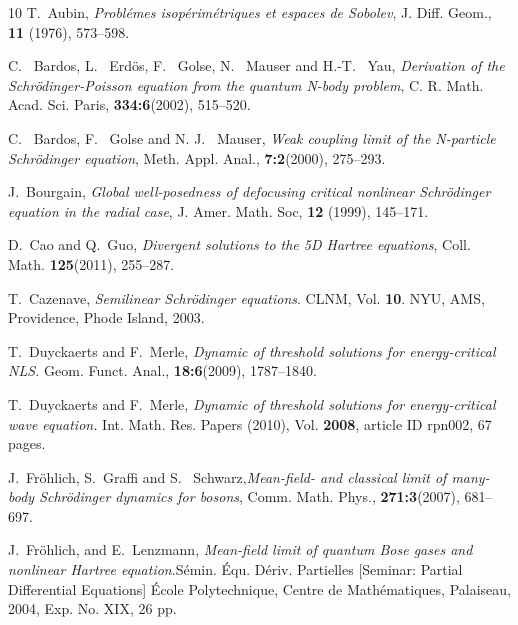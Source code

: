 \documentclass[reqno, 11pt]{amsart}
\numberwithin{equation}{section}
\theoremstyle{plain}
\theoremstyle{definition}
\numberwithin{equation}{section}
\numberwithin{theorem}{section}
\numberwithin{equation}{section}
\numberwithin{equation}{section}
\numberwithin{theorem}{section}
\begin{document}
	
	\def\cprime{$'$}
	\begin{thebibliography}{10}
		T.~Aubin, \emph{Probl\'emes isop\'erim\'etriques et espaces de Sobolev},
		J. Diff. Geom., \textbf{11} (1976), 573--598.
		
		C. ~Bardos, L. ~Erd\"{o}s, F. ~Golse, N. ~Mauser and H.-T. ~Yau,\emph{ Derivation of the Schr\"{o}dinger-Poisson equation from the quantum N-body problem}, C. R. Math. Acad. Sci. Paris, \textbf{334:6}(2002), 515--520.
		
		C. ~Bardos, F. ~Golse and N. J. ~Mauser,\emph{ Weak coupling limit of the N-particle Schr\"{o}dinger equation}, Meth. Appl. Anal., \textbf{7:2}(2000), 275--293.
		
		
		J.~Bourgain, \emph{Global well-posedness of defocusing critical nonlinear Schr\"{o}dinger equation in the radial case}, J. Amer. Math. Soc, \textbf{12} (1999), 145--171.
		
		D.~Cao and Q.~Guo, \emph{Divergent solutions to the 5D Hartree equations}, Coll. Math. \textbf{125}(2011), 255--287.
		
		T.~Cazenave, \emph{Semilinear Schr\"{o}dinger equations}. CLNM, Vol. \textbf{10}.  NYU, AMS, Providence, Phode Island, 2003.	
		
		 T.~Duyckaerts and F.~Merle,
		\emph{Dynamic of threshold solutions for energy-critical NLS.}
		Geom. Funct. Anal., \textbf{18:6}(2009), 1787--1840.
		
		T.~Duyckaerts and F.~Merle,
		\emph{Dynamic of threshold solutions for energy-critical wave
			equation.} Int. Math. Res. Papers (2010), Vol. \textbf{2008},
		article ID rpn002, 67 pages.
		
		J.~Fr\"{o}hlich, S.~Graffi and S. ~Schwarz,\emph{Mean-field- and classical limit of many-body Schr\"{o}dinger dynamics for bosons}, Comm. Math. Phys., \textbf{271:3}(2007), 681--697.
		
		J.~Fr\"{o}hlich, and E.~Lenzmann,
		\emph{Mean-field limit of quantum Bose gases and nonlinear Hartree equation}.S\'emin. \'Equ. D\'eriv. Partielles [Seminar: Partial Differential Equations]
		\'Ecole Polytechnique, Centre de Math\'ematiques, Palaiseau, 2004, Exp. No. XIX, 26 pp.
		

\end{thebibliography}
\end{document}
